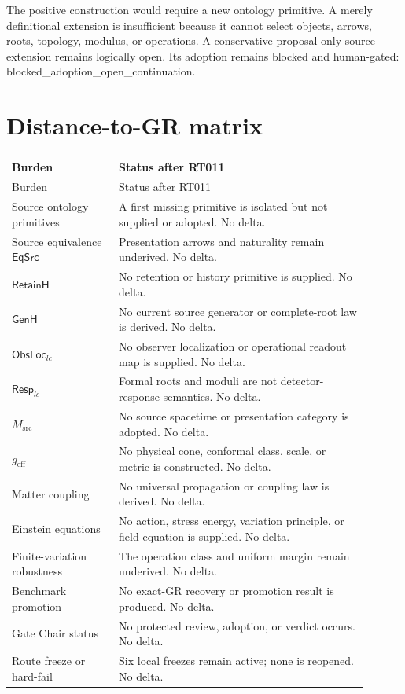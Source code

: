 \documentclass[11pt]{article}
\newcommand{\EqSrc}{\mathsf{EqSrc}}
\newcommand{\status}[1]{\textsf{#1}}
\begin{document}
The positive construction would require a new ontology primitive.  A merely
definitional extension is insufficient because it cannot select objects,
arrows, roots, topology, modulus, or operations.  A conservative proposal-only
source extension remains logically open.  Its adoption remains blocked and
human-gated: \status{blocked\_adoption\_open\_continuation}.

\section{Distance-to-GR matrix}

\begin{longtable}{P{0.27\linewidth}P{0.63\linewidth}}
\toprule
Burden & Status after RT011 \\
\midrule
\endfirsthead
\toprule
Burden & Status after RT011 \\
\midrule
\endhead
Source ontology primitives & A first missing primitive is isolated but not supplied or adopted.  No delta.\\
Source equivalence \(\EqSrc\) & Presentation arrows and naturality remain underived.  No delta.\\
\(\mathsf{RetainH}\) & No retention or history primitive is supplied.  No delta.\\
\(\mathsf{GenH}\) & No current source generator or complete-root law is derived.  No delta.\\
\(\mathsf{ObsLoc}_{lc}\) & No observer localization or operational readout map is supplied.  No delta.\\
\(\mathsf{Resp}_{lc}\) & Formal roots and moduli are not detector-response semantics.  No delta.\\
\(M_{\mathrm{src}}\) & No source spacetime or presentation category is adopted.  No delta.\\
\(g_{\mathrm{eff}}\) & No physical cone, conformal class, scale, or metric is constructed.  No delta.\\
Matter coupling & No universal propagation or coupling law is derived.  No delta.\\
Einstein equations & No action, stress energy, variation principle, or field equation is supplied.  No delta.\\
Finite-variation robustness & The operation class and uniform margin remain underived.  No delta.\\
Benchmark promotion & No exact-GR recovery or promotion result is produced.  No delta.\\
Gate Chair status & No protected review, adoption, or verdict occurs.  No delta.\\
Route freeze or hard-fail & Six local freezes remain active; none is reopened.  No delta.\\
\bottomrule
\end{longtable}
\end{document}
